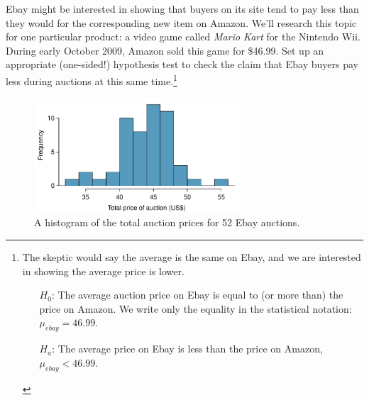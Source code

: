 \begin{exercise} \label{ebayAmazonOneSidedTestExercise}
Ebay might be interested in showing that buyers on its site tend to pay less than they would for the corresponding new item on Amazon. We'll research this topic for one particular product: a video game called \emph{Mario Kart} for the Nintendo Wii. During early October 2009, Amazon sold this game for \$46.99. Set up an appropriate (one-sided!) hypothesis test to check the claim that Ebay buyers pay less during auctions at this same time.\footnote{The skeptic would say the average is the same on Ebay, and we are interested in showing the average price is lower.
\begin{itemize}
\setlength{\itemsep}{0mm}
\item[$H_0$:] The average auction price on Ebay is equal to (or more than) the price on Amazon. We write only the equality in the statistical notation: $\mu_{ebay} = 46.99$.
\item[$H_a$:] The average price on Ebay is less than the price on Amazon, $\mu_{ebay} < 46.99$.
\end{itemize}}
\end{exercise}



\begin{figure}
   \centering
   \includegraphics[width=0.68\textwidth]{04/figures/ebayMarioKartAuctionPriceHistogramFor3ConditionsExercise/ebayMarioKartAuctionPriceHistogramFor3ConditionsExercise}
   \caption{A histogram of the total auction prices for 52 Ebay auctions.}
   \label{ebayMarioKartAuctionPriceHistogramFor3ConditionsExercise}
\end{figure}

